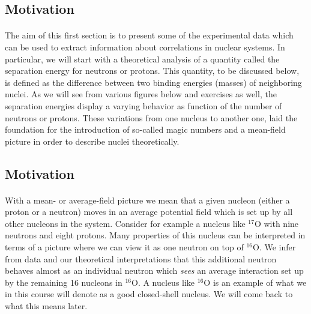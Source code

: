 \documentclass[%
twoside,                 %
final,                   %
10pt]{article}
\begin{document}
\subsection*{Motivation}

\paragraph{}

The aim of this first section is to present some of the experimental data which can be used to extract 
information about correlations in nuclear systems. In particular, we will start with a theoretical analysis of a quantity called the separation energy for neutrons or protons. This quantity, to be discussed below, is defined as the difference between two binding energies (masses) of neighboring nuclei. As we will see from various figures below and exercises as well, the separation energies display a varying behavior as function of the number of neutrons or protons. These variations from one nucleus to another one, laid the foundation for the introduction of so-called magic numbers and a mean-field picture in order to describe nuclei theoretically.





\subsection*{Motivation}

\paragraph{}

With a mean- or average-field picture we mean that a given nucleon (either a proton or a neutron) moves in an average potential field which is set up by all other nucleons in the system. Consider for example a nucleus like ${}^{17}\mbox{O}$ with nine neutrons and eight protons. Many properties  of this nucleus can be interpreted in terms of a picture where we can view it as
one neutron on top of ${}^{16}\mbox{O}$. We infer from data and our theoretical interpretations that this additional neutron behaves almost as an individual neutron which \emph{sees} an average interaction set up by the remaining 16 nucleons in   ${}^{16}\mbox{O}$. A nucleus like ${}^{16}\mbox{O}$ is an example of what we in this course will denote as a good closed-shell nucleus. We will come back to what this means later.
\end{document}

